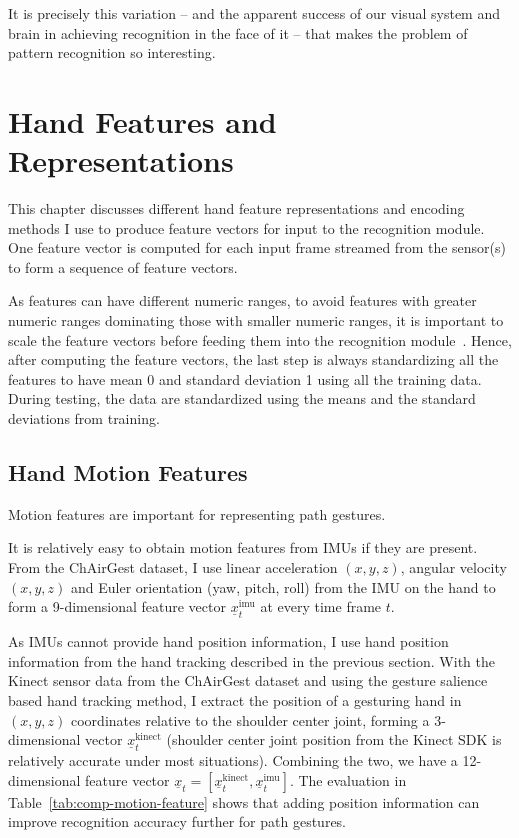 \begin{savequote}
It is precisely this variation -- and the apparent success of our visual system
and brain in achieving recognition in the face of it -- that makes the problem
of pattern recognition so interesting.
\end{savequote}
\chapter{Hand Features and Representations}\label{chap:feature}
This chapter discusses different 
hand feature representations and encoding methods I use to produce feature
vectors for input to the recognition module.  One feature vector is computed
for each input frame streamed from the sensor(s) to form a sequence of feature
vectors.

As features can have different numeric ranges, to avoid features with greater
numeric ranges dominating those with smaller numeric ranges, it is important to
scale the feature vectors before feeding them  into the recognition
module~\cite{hsu10}. Hence, after computing the feature vectors, the last step
is always standardizing all the features to have mean 0 and standard deviation 1
using all the training data. During testing, the data are standardized using the means and the standard deviations from training.

\section{Hand Motion Features}
Motion features are important for representing path gestures. 

It is relatively easy to obtain motion features from IMUs if they are present.
From the ChAirGest dataset, I use linear acceleration $(x, y, z)$,
angular velocity $(x, y, z)$ and Euler orientation (yaw, pitch, roll) from the
IMU on the hand to form a 9-dimensional feature vector
$\underline{x}_t^{\text{imu}}$ at every time frame $t$.

As IMUs cannot provide hand position information, I use hand position
information from the hand tracking described in the previous section. With the
Kinect sensor data from the ChAirGest dataset and using the gesture salience
based hand tracking method, I extract the position of a gesturing hand in $(x,
y, z)$ coordinates relative to the shoulder center joint, forming a
3-dimensional vector $\underline{x}^\text{kinect}_t$ (shoulder center joint
position from the Kinect SDK is relatively accurate under most situations).
Combining the two, we
have a 12-dimensional feature vector $\underline{x}_t =
[\underline{x}^\text{kinect}_t, \underline{x}^\text{imu}_t]$.
The evaluation in Table~\ref{tab:comp-motion-feature} shows that adding
position information can improve recognition accuracy further for path gestures.

